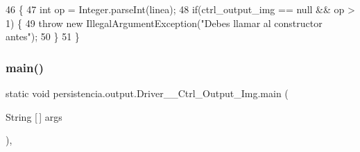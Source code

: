 \begin{DoxyCode}
46                                                                                           \{
47         \textcolor{keywordtype}{int} op = Integer.parseInt(linea);
48         \textcolor{keywordflow}{if}(ctrl\_output\_img == null && op > 1) \{
49             \textcolor{keywordflow}{throw} \textcolor{keyword}{new} IllegalArgumentException(\textcolor{stringliteral}{"Debes llamar al constructor antes"});
50         \}
51     \}
\end{DoxyCode}
\mbox{\label{classpersistencia_1_1output_1_1Driver____Ctrl__Output__Img_a7ea6be01dbe68f043b4fb50b7ba41f8b}} 
\subsubsection{\texorpdfstring{main()}{main()}}
{\footnotesize\ttfamily static void persistencia.\+output.\+Driver\+\_\+\+\_\+\+Ctrl\+\_\+\+Output\+\_\+\+Img.\+main (\begin{DoxyParamCaption}\item[{String \mbox{[}$\,$\mbox{]}}]{args }\end{DoxyParamCaption})\hspace{0.3cm}{\ttfamily [inline]}, {\ttfamily [static]}}


